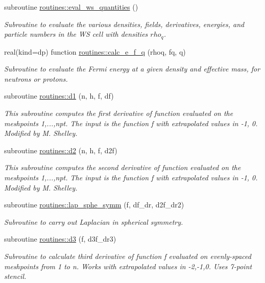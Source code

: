 \begin{DoxyCompactItemize}
subroutine \mbox{\hyperlink{namespaceroutines_a93de76f3b26ead66893f46dc4892dbcb}{routines\+::eval\+\_\+ws\+\_\+quantities}} ()
\begin{DoxyCompactList}\small\item\em Subroutine to evaluate the various densities, fields, derivatives, energies, and particle numbers in the WS cell with densities $rho_q$. \end{DoxyCompactList}\item 
real(kind=dp) function \mbox{\hyperlink{namespaceroutines_a8f2a013c7bb06da429f995e288515248}{routines\+::calc\+\_\+e\+\_\+f\+\_\+q}} (rhoq, fq, q)
\begin{DoxyCompactList}\small\item\em Subroutine to evaluate the Fermi energy at a given density and effective mass, for neutrons or protons. \end{DoxyCompactList}\item 
subroutine \mbox{\hyperlink{namespaceroutines_a92e52c281532c938dfa10d85404a367a}{routines\+::d1}} (n, h, f, df)
\begin{DoxyCompactList}\small\item\em This subroutine computes the first derivative of function evaluated on the meshpoints 1,...,npt. The input is the function f with extrapolated values in -\/1, 0. Modified by M. Shelley. \end{DoxyCompactList}\item 
subroutine \mbox{\hyperlink{namespaceroutines_aafc8447e9af12216ae995f63c1606f1a}{routines\+::d2}} (n, h, f, d2f)
\begin{DoxyCompactList}\small\item\em This subroutine computes the second derivative of function evaluated on the meshpoints 1,...,npt. The input is the function f with extrapolated values in -\/1, 0. Modified by M. Shelley. \end{DoxyCompactList}\item 
subroutine \mbox{\hyperlink{namespaceroutines_a635a2461a6c20207dd3b268842381ce3}{routines\+::lap\+\_\+sphe\+\_\+symm}} (f, df\+\_\+dr, d2f\+\_\+dr2)
\begin{DoxyCompactList}\small\item\em Subroutine to carry out Laplacian in spherical symmetry. \end{DoxyCompactList}\item 
subroutine \mbox{\hyperlink{namespaceroutines_ac563b00969cb307d71ebc02aaef0a3b4}{routines\+::d3}} (f, d3f\+\_\+dr3)
\begin{DoxyCompactList}\small\item\em Subroutine to calculate third derivative of function f evaluated on evenly-\/spaced meshpoints from 1 to n. Works with extrapolated values in -\/2,-\/1,0. Uses 7-\/point stencil. \end{DoxyCompactList}\item 

\end{DoxyCompactItemize}
